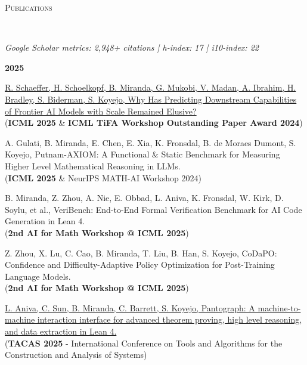\documentclass{article}
\newenvironment{changemargin}[2]{%
  \begin{list}{}{%
    \setlength{\topsep}{0pt}%
    \setlength{\leftmargin}{#1}%
    \setlength{\rightmargin}{#2}%
    \setlength{\listparindent}{\parindent}%
    \setlength{\itemindent}{\parindent}%
    \setlength{\parsep}{\parskip}%
  }%
  \item[]}{\end{list}
}
\newcommand{\lineover}{
	\begin{changemargin}{-0.05in}{-0.05in}
		\vspace*{-8pt}
		\hrulefill \\
		\vspace*{-2pt}
	\end{changemargin}
}
\newcommand{\header}[1]{
	\begin{changemargin}{-0.5in}{-0.5in}
		\scshape{#1}\\
  	\lineover
	\end{changemargin}
}
\newenvironment{body} {
	\vspace*{-16pt}
	\begin{changemargin}{-0.25in}{-0.5in}
  }	
	{\end{changemargin}
}
\begin{document}
\header{Publications}
\begin{body}
    \vspace{4pt} %

    \vspace{8pt}
    \emph{Google Scholar metrics: 2,948+ citations | h-index: 17 | i10-index: 22}

    \vspace{12pt}
    \textbf{\large 2025}
    \vspace{4pt}

    \vspace{10pt}
    \href{https://arxiv.org/pdf/2406.04391}
    {R. Schaeffer, H. Schoelkopf, B. Miranda, G. Mukobi, V. Madan, A. Ibrahim, H. Bradley, S. Biderman, S. Koyejo,
    Why Has Predicting Downstream Capabilities of Frontier AI Models with Scale Remained Elusive?}
    \\
    (\textbf{ICML 2025} \& \textbf{ICML TiFA Workshop Outstanding Paper Award 2024})

    \vspace{10pt}
    {A. Gulati, B. Miranda, E. Chen, E. Xia, K. Fronsdal, B. de Moraes Dumont, S. Koyejo,
    Putnam-AXIOM: A Functional \& Static Benchmark for Measuring Higher Level Mathematical Reasoning in LLMs.}
    \\
    (\textbf{ICML 2025} \& NeurIPS MATH-AI Workshop 2024)

    \vspace{10pt}
    {B. Miranda, Z. Zhou, A. Nie, E. Obbad, L. Aniva, K. Fronsdal, W. Kirk, D. Soylu, et al.,
    VeriBench: End-to-End Formal Verification Benchmark for AI Code Generation in Lean 4.}
    \\
    (\textbf{2nd AI for Math Workshop @ ICML 2025})

    \vspace{10pt}
    {Z. Zhou, X. Lu, C. Cao, B. Miranda, T. Liu, B. Han, S. Koyejo,
    CoDaPO: Confidence and Difficulty-Adaptive Policy Optimization for Post-Training Language Models.}
    \\
    (\textbf{2nd AI for Math Workshop @ ICML 2025})

    \vspace{10pt}
    \href{https://link.springer.com/chapter/10.1007/978-3-031-90643-5_6}
    {L. Aniva, C. Sun, B. Miranda, C. Barrett, S. Koyejo,
    Pantograph: A machine-to-machine interaction interface for advanced theorem proving, high level reasoning, and data extraction in Lean 4.}
    \\
    (\textbf{TACAS 2025} - International Conference on Tools and Algorithms for the Construction and Analysis of Systems)


\end{body}
\end{document}
